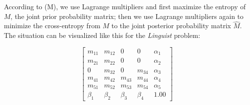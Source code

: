 \documentclass[12pt]{article}
\begin{document}
According to (M), we use Lagrange multipliers and first maximize the
entropy of $M$, the joint prior probability matrix; then we use
Lagrange multipliers again to minimize the cross-entropy from $M$ to
the joint posterior probability matrix $\hat{M}$. The situation can be
visualized like this for the \emph{Linguist} problem:


\begin{equation}
  \label{eq:p5}
      \left[
      \begin{array}{ccccc}
        m_{11} & m_{12} & 0 & 0 & \alpha_{1} \\
        m_{21} & m_{22} & 0 & 0 & \alpha_{2} \\
        0 & m_{32} & 0 & m_{34} & \alpha_{3} \\
        m_{41} & m_{42} & m_{43} & m_{44} & \alpha_{4} \\
        m_{51} & m_{52} & m_{53} & m_{54} & \alpha_{5} \\
        \beta_{1} & \beta_{2} & \beta_{3} & \beta_{4} & 1.00
      \end{array}
\right]
\end{equation}
\end{document}
